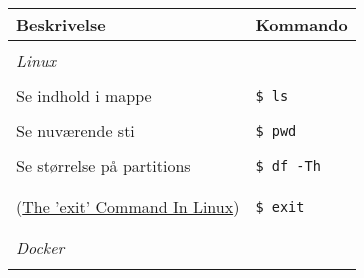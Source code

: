 \begin{figure}[H]
    \centering
    \begin{tabular}{l l}
        \textbf{Beskrivelse} & \textbf{Kommando} \\
        \hline
        & \\
        \textit{Linux} & \\
        & \\
        \begin{minipage}
            {0.5\textwidth}
            Se indhold i mappe
        \end{minipage}& 
        \begin{minipage}
            {0.5\textwidth}
            \texttt{\$ ls}
        \end{minipage} \\
        & \\
        \begin{minipage}
            {0.5\textwidth}
            Se nuværende sti
        \end{minipage}& 
        \begin{minipage}
            {0.5\textwidth}
            \texttt{\$ pwd}
        \end{minipage} \\
        & \\
        \begin{minipage}
            {0.5\textwidth}
            Se størrelse på partitions
        \end{minipage}& 
        \begin{minipage}
            {0.5\textwidth}
            \texttt{\$ df -Th}
        \end{minipage} \\
        & \\
        \begin{minipage}
            {0.5\textwidth}
            Luk terminalen\\
            ({\small\href{https://www.youtube.com/watch?v=95oGJPDebeE}{The 'exit' Command In Linux}})
        \end{minipage}& 
        \begin{minipage}
            {0.5\textwidth}
            \texttt{\$ exit}
        \end{minipage} \\
        & \\
        \hline
        & \\
        \textit{Docker} & \\
        & \\

\end{tabular}
\end{figure}
